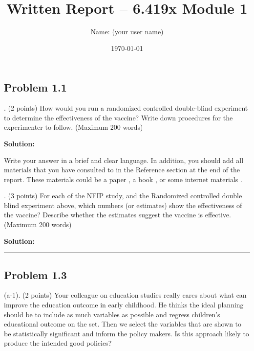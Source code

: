 \documentclass[11pt]{article}
\author{Name: (your user name)}%
\title{Written Report – 6.419x Module 1}%
\date{\today}%
\makeatletter
\let\thetitle\@title
\let\theauthor\@author
\newenvironment{question}
  {\itshape\list{}{\leftmargin=0em\rightmargin=0em}%
   \item\relax}
  {\endlist\ignorespacesafterend}
\newenvironment{solution}
  {\textbf{Solution: }\list{}{\leftmargin=1em\rightmargin=0em}%
   \item\relax}
  {\endlist\ignorespacesafterend}
\newcommand*\sepline{%
  \nopagebreak\vspace{\baselineskip}\noindent\textcolor{black!10!white}{\rule{\textwidth}{2pt}}\vspace{\baselineskip}
}
\makeatother
\begin{document}
\section*{\centering\thetitle}
\subsection*{\raggedleft\theauthor}


\subsection*{Problem 1.1}
\begin{question}
1. (2 points) 
How would you run a randomized controlled double-blind experiment to determine the effectiveness of the vaccine? Write down procedures for the experimenter to follow. 
(Maximum 200 words)
\end{question}

\begin{solution}
Write your answer in a brief and clear language. In addition, you should add all materials that you have consulted to in the Reference section at the end of the report.  These materials could be a paper \cite{Wasserstein:2016}, a book \cite{Gustavii:2017}, or some internet materials \cite{Wiki:PCA}.
\end{solution}

\begin{question}
2. (3 points) 
For each of the NFIP study, and the Randomized controlled double blind experiment above, which numbers (or estimates) show the effectiveness of the vaccine? Describe whether the estimates suggest the vaccine is effective.
(Maximum 200 words)
\end{question}

\begin{solution}
\end{solution}


\sepline


\subsection*{Problem 1.3}
\begin{question}
(a-1). (2 points) 
Your colleague on education studies really cares about what can improve the education outcome in early childhood. He thinks the ideal planning should be to include as much variables as possible and regress children's educational outcome on the set. Then we select the variables that are shown to be statistically significant and inform the policy makers. Is this approach likely to produce the intended good policies?
\end{question}
\end{document}
